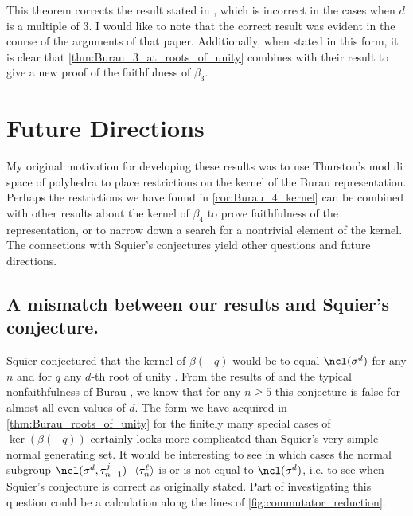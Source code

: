 \documentclass{amsart}
\begin{document}
    This theorem corrects the result stated in \cite[Theorem 1.2]{Funar2014OnUnity}, which is incorrect in the cases when $d$ is a multiple of 3. I would like to note that the correct result was evident in the course of the arguments of that paper. Additionally, when stated in this form, it is clear that \cref{thm:Burau_3_at_roots_of_unity} combines with their result \cite[Theorem 2.1]{Funar2014OnUnity} to give a new proof of the faithfulness of $\beta_3$.
    
\section{Future Directions}\label{sec:conclusion}
    My original motivation for developing these results was to use Thurston's moduli space of polyhedra to place restrictions on the kernel of the Burau representation. Perhaps the restrictions we have found in \cref{cor:Burau_4_kernel} can be combined with other results about the kernel of $\beta_4$ to prove faithfulness of the representation, or to narrow down a search for a nontrivial element of the kernel. The connections with Squier's conjectures yield other questions and future directions.
    
    \subsection*{A mismatch between our results and Squier's conjecture.} Squier conjectured that the kernel of $\beta(-q)$ would be to equal $\ncl(\sigma^d)$ for any $n$ and for $q$ any $d$-th root of unity \cite[(C1)]{Squier1984TheUnitary}. From the results of \cite{Funar2014OnUnity} and the typical nonfaithfulness of Burau \cite{Bigelow1999The5}, we know that for any $n \geq 5$ this conjecture is false for almost all even values of $d$. The form we have acquired in \cref{thm:Burau_roots_of_unity} for the finitely many special cases of $\ker(\beta(-q))$ certainly looks more complicated than Squier's very simple normal generating set. It would be interesting to see in which cases the normal subgroup $\ncl(\sigma^d,\tau_{n-1}^j) \cdot \langle \tau_n^\ell \rangle$ is or is not equal to $\ncl(\sigma^d)$, i.e. to see when Squier's conjecture is correct as originally stated. Part of investigating this question could be a calculation along the lines of \cref{fig:commutator_reduction}.
\end{document}
